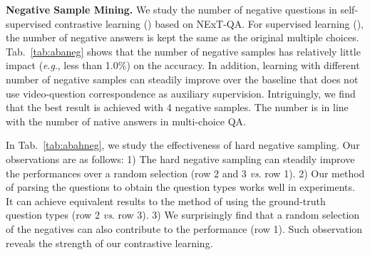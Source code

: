 \documentclass[10pt,journal,compsoc]{IEEEtran}
\newcommand{\vs}{\textit{vs}. }
\newcommand{\eg}{\textit{e}.\textit{g}.}
\begin{document}
\textbf{Negative Sample Mining.}
We study the number of negative questions in self-supervised contrastive learning () based on NExT-QA. For supervised learning (), the number of negative answers is kept the same as the original multiple choices. Tab.~\ref{tab:abaneg} shows that the number of negative samples has relatively little impact (\eg, less than 1.0\%) on the accuracy. In addition, learning with different number of negative samples can steadily improve over the baseline that does not use video-question correspondence as auxiliary supervision. Intriguingly, we find that the best result is achieved with 4 negative samples. The number is in line with the number of native answers in multi-choice QA. 
\setlength{\tabcolsep}{5pt}
\begin{table}[t!]
    \small
    \centering
    \caption{Study the number of negative questions in .}
    \label{tab:abaneg}
    \vspace{-0.5em}
    \vspace{-0.4cm}
\end{table}

In Tab.~\ref{tab:abahneg}, we study the effectiveness of hard negative sampling. Our observations are as follows: 1) The hard negative sampling can steadily improve the performances over a random selection (row 2 and 3 \vs row 1). 2) Our method of parsing the questions to obtain the question types works well in experiments. It can achieve equivalent results to the method of using the ground-truth question types (row 2 \vs row 3). 3) We surprisingly find that a random selection of the negatives can also contribute to the performance (row 1). Such observation reveals the strength of our contrastive learning.
\setlength{\tabcolsep}{5pt}
\begin{table}[t!]
    \small
    \centering
    \caption{Study hard negative samples. Random: randomly sample the negatives. PQ: our method by parsing the questions. GT: use the ground-truth type annotations.}
    \label{tab:abahneg}
    \vspace{-0.5em}
\end{table}
\end{document}
